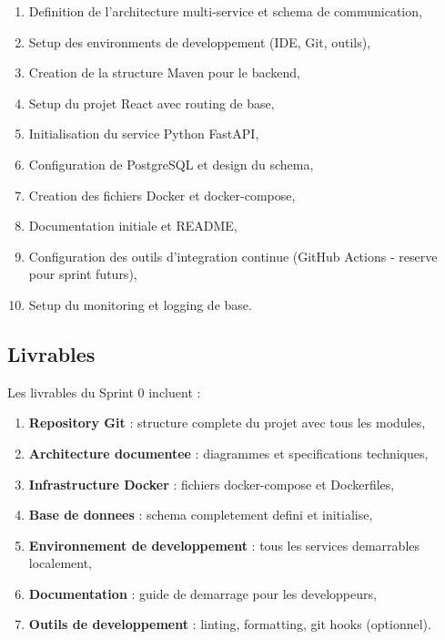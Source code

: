 \begin{enumerate}
    \item Definition de l'architecture multi-service et schema de communication,
    
    \item Setup des environments de developpement (IDE, Git, outils),
    
    \item Creation de la structure Maven pour le backend,
    
    \item Setup du projet React avec routing de base,
    
    \item Initialisation du service Python FastAPI,
    
    \item Configuration de PostgreSQL et design du schema,
    
    \item Creation des fichiers Docker et docker-compose,
    
    \item Documentation initiale et README,
    
    \item Configuration des outils d'integration continue (GitHub Actions - reserve pour sprint futurs),
    
    \item Setup du monitoring et logging de base.
\end{enumerate}

\subsection{Livrables}

Les livrables du Sprint 0 incluent :

\begin{enumerate}
    \item \textbf{Repository Git} : structure complete du projet avec tous les modules,
    
    \item \textbf{Architecture documentee} : diagrammes et specifications techniques,
    
    \item \textbf{Infrastructure Docker} : fichiers docker-compose et Dockerfiles,
    
    \item \textbf{Base de donnees} : schema completement defini et initialise,
    
    \item \textbf{Environnement de developpement} : tous les services demarrables localement,
    
    \item \textbf{Documentation} : guide de demarrage pour les developpeurs,
    
    \item \textbf{Outils de developpement} : linting, formatting, git hooks (optionnel).
\end{enumerate}

